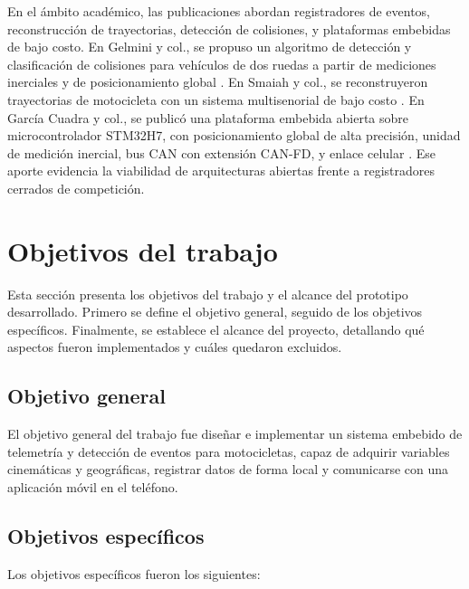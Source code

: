 En el ámbito académico, las publicaciones abordan registradores de eventos, reconstrucción de trayectorias, detección de colisiones, y plataformas embebidas de bajo costo. En Gelmini y col., se propuso un algoritmo de detección y clasificación de colisiones para vehículos de dos ruedas a partir de mediciones inerciales y de posicionamiento global \citep{gelmini2021_crash}. En Smaiah y col., se reconstruyeron trayectorias de motocicleta con un sistema multisenorial de bajo costo \citep{smaiah2018_trajectory}. En García Cuadra y col., se publicó una plataforma embebida abierta sobre microcontrolador STM32H7, con posicionamiento global de alta precisión, unidad de medición inercial, bus CAN con extensión CAN-FD, y enlace celular \citep{garcia2026_moto_telemetry}. Ese aporte evidencia la viabilidad de arquitecturas abiertas frente a registradores cerrados de competición.

\section{Objetivos del trabajo}
\label{sec:objetivos}

Esta sección presenta los objetivos del trabajo y el alcance del prototipo desarrollado. Primero se define el objetivo general, seguido de los objetivos específicos. Finalmente, se establece el alcance del proyecto, detallando qué aspectos fueron implementados y cuáles quedaron excluidos.

\subsection{Objetivo general}
\label{sec:objetivo-general}

El objetivo general del trabajo fue diseñar e implementar un sistema embebido de telemetría y detección de eventos para motocicletas, capaz de adquirir variables cinemáticas y geográficas, registrar datos de forma local y comunicarse con una aplicación móvil en el teléfono.

\subsection{Objetivos específicos}
\label{sec:objetivos-especificos}

Los objetivos específicos fueron los siguientes:

